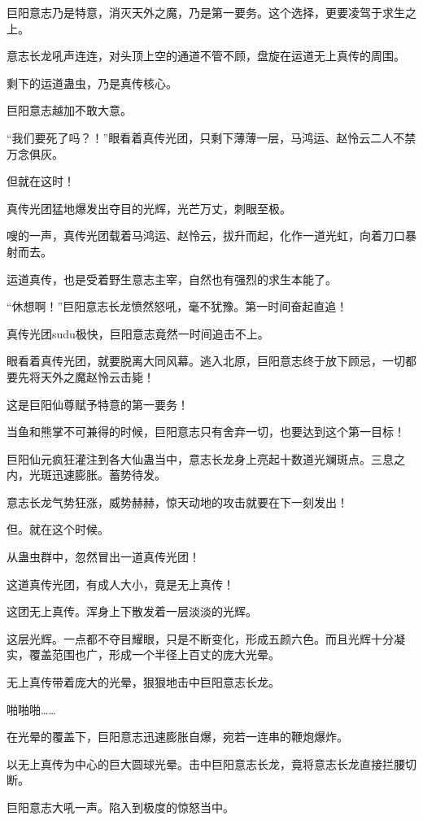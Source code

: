 \begin{this_body}
巨阳意志乃是特意，消灭天外之魔，乃是第一要务。这个选择，更要凌驾于求生之上。

意志长龙吼声连连，对头顶上空的通道不管不顾，盘旋在运道无上真传的周围。

剩下的运道蛊虫，乃是真传核心。

巨阳意志越加不敢大意。

“我们要死了吗？！”眼看着真传光团，只剩下薄薄一层，马鸿运、赵怜云二人不禁万念俱灰。

但就在这时！

真传光团猛地爆发出夺目的光辉，光芒万丈，刺眼至极。

嗖的一声，真传光团载着马鸿运、赵怜云，拔升而起，化作一道光虹，向着刀口暴射而去。

运道真传，也是受着野生意志主宰，自然也有强烈的求生本能了。

“休想啊！”巨阳意志长龙愤然怒吼，毫不犹豫。第一时间奋起直追！

真传光团sudu极快，巨阳意志竟然一时间追击不上。

眼看着真传光团，就要脱离大同风幕。逃入北原，巨阳意志终于放下顾忌，一切都要先将天外之魔赵怜云击毙！

这是巨阳仙尊赋予特意的第一要务！

当鱼和熊掌不可兼得的时候，巨阳意志只有舍弃一切，也要达到这个第一目标！

巨阳仙元疯狂灌注到各大仙蛊当中，意志长龙身上亮起十数道光斓斑点。三息之内，光斑迅速膨胀。蓄势待发。

意志长龙气势狂涨，威势赫赫，惊天动地的攻击就要在下一刻发出！

但。就在这个时候。

从蛊虫群中，忽然冒出一道真传光团！

这道真传光团，有成人大小，竟是无上真传！

这团无上真传。浑身上下散发着一层淡淡的光辉。

这层光辉。一点都不夺目耀眼，只是不断变化，形成五颜六色。而且光辉十分凝实，覆盖范围也广，形成一个半径上百丈的庞大光晕。

无上真传带着庞大的光晕，狠狠地击中巨阳意志长龙。

啪啪啪……

在光晕的覆盖下，巨阳意志迅速膨胀自爆，宛若一连串的鞭炮爆炸。

以无上真传为中心的巨大圆球光晕。击中巨阳意志长龙，竟将意志长龙直接拦腰切断。

巨阳意志大吼一声。陷入到极度的惊怒当中。


\end{this_body}
